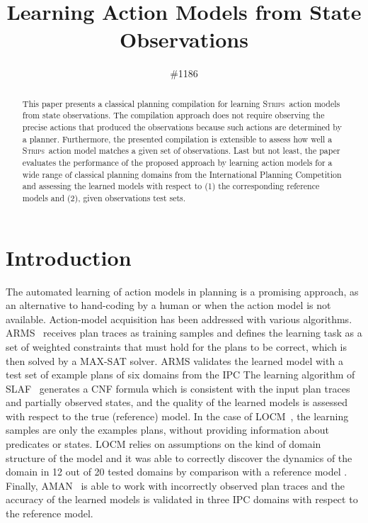 \documentclass{article}
\title{Learning Action Models from State Observations}
\author{\#1186
}
\newcommand{\strips}{\textsc{Strips}}     %
\begin{document}
\maketitle

\begin{abstract}
This paper presents a classical planning compilation for learning \strips\ action models from state observations. The compilation approach does not require observing the precise actions that produced the observations because such actions are determined by a planner. Furthermore, the presented compilation is extensible to assess how well a \strips\ action model matches a given set of observations. Last but not least, the paper evaluates the performance of the proposed approach by learning action models for a wide range of classical planning domains from the International Planning Competition and assessing the learned models with respect to (1) the corresponding reference models and (2), given observations test sets.
\end{abstract}


\section{Introduction}

The automated learning of action models in planning is a promising approach, as an alternative to hand-coding by a human or when the action model is not available. Action-model acquisition has been addressed with various algorithms. {\sc ARMS}~\cite{yang2007learning} receives  plan traces as training samples and defines the learning task as a set of weighted constraints that must hold for the plans to be correct, which is then solved by a MAX-SAT solver. {\sc ARMS} validates the learned model with a test set of example plans of six domains from the IPC %
The learning algorithm of {\sc SLAF}~\cite{amir:alearning:JAIR08} generates a CNF formula which is consistent with the input plan traces and partially observed states, and the quality of the learned models is assessed with respect to the true (reference) model. In the case of {\sc LOCM}~\cite{cresswell2013acquiring}, the learning samples are only the examples plans, without providing information about predicates or states. {\sc LOCM} relies on assumptions on the kind of domain structure of the model and it was able to correctly discover the dynamics of the domain in 12 out of 20 tested domains by comparison with a reference model \cite{GregoryC16}. Finally, {\sc AMAN}~\cite{zhuo2013action} is able to work with incorrectly observed plan traces and the accuracy of the learned models is validated in three IPC domains with respect to the reference model.
\end{document}
